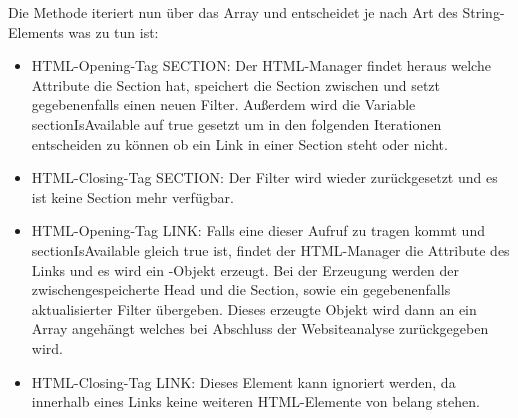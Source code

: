 Die Methode iteriert nun über das Array und entscheidet je nach Art des String-Elements was zu tun ist:
\begin{itemize}
	\item HTML-Opening-Tag SECTION: Der HTML-Manager findet heraus welche Attribute die Section hat, speichert die Section zwischen und setzt gegebenenfalls einen neuen Filter. Außerdem wird die Variable sectionIsAvailable auf true gesetzt um in den folgenden Iterationen entscheiden zu können ob ein Link in einer Section steht oder nicht.
	\item HTML-Closing-Tag SECTION: Der Filter wird wieder zurückgesetzt und es ist keine Section mehr verfügbar.
	\item HTML-Opening-Tag LINK: Falls eine dieser Aufruf zu tragen kommt und sectionIsAvailable gleich true ist, findet der HTML-Manager die Attribute des Links und es wird ein \SECH-Objekt erzeugt. Bei der Erzeugung werden der zwischengespeicherte Head und die Section, sowie ein gegebenenfalls aktualisierter Filter übergeben. Dieses erzeugte Objekt wird dann an ein Array angehängt welches bei Abschluss der Websiteanalyse zurückgegeben wird.
	\item HTML-Closing-Tag LINK: Dieses Element kann ignoriert werden, da innerhalb eines Links keine weiteren HTML-Elemente von belang stehen.
\end{itemize}


